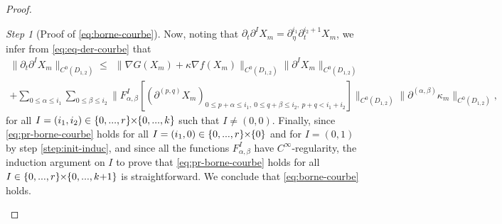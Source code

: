 \documentclass{article}
\newcommand{\DI}{\partial^I}
\newcommand{\PLH}{{\mkern-1mu\times\mkern-1mu}}
\newcommand{\Times}{\PLH}
\newcommand{\ko}{\kappa}
\theoremstyle{remark}
\theoremstyle{prpart}
\newtheorem{proofpart}{Step}
\begin{document}
\begin{proof}
\begin{proofpart}[Proof of \eqref{eq:borne-courbe}]
Now, noting that $\partial_t\DI X_m = \partial_{\eta}^{i_1}\partial_{t}^{i_2+1}X_m$, we infer from \eqref{eq:eq-der-courbe} that
\small
\begin{multline*}
\|\partial_t\DI X_m\|_{C^0(D_{1,2})} \leq ~~\|\nabla G(X_m) + \ko\nabla f(X_m)\|_{C^0(D_{1,2})}\|\DI X_m\|_{C^0(D_{1,2})} \\
+ \sum_{0\leq\alpha\leq i_1}\sum_{0\leq\beta\leq i_2}\Big\|F^I_{\alpha,\beta}\left[(\partial^{(p,q)}X_m)_{0\leq p+\alpha \leq i_1,~0\leq q+\beta\leq i_2,~p+q<i_1+i_2}\right]\Big\|_{C^0(D_{1,2})}\|\partial^{(\alpha,\beta)}\ko_m\|_{C^0(D_{1,2})},
\end{multline*}
\normalsize
for all $I=(i_1,i_2)\in\{0,...,r\}\Times\{0,...,k\}$ such that $I\neq(0,0)$. Finally, since \eqref{eq:pr-borne-courbe} holds for all $I=(i_1,0)\in\{0,...,r\}\Times\{0\}$ and for $I=(0,1)$ by step \ref{step:init-induc}, and since all the functions $F^I_{\alpha,\beta}$ have $C^\infty$-regularity, the induction argument on $I$ to prove that \eqref{eq:pr-borne-courbe} holds for all $I\in\{0,...,r\}\Times\{0,...,k{+}1\}$ is straightforward. We conclude that \eqref{eq:borne-courbe} holds.
\end{proofpart}


\end{proof}
\end{document}

